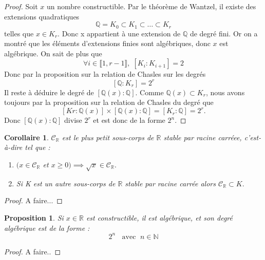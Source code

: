 \documentclass[a4paper,12pt,french]{report}
\newtheorem{proposition}{Proposition}[section]
\newtheorem{corollaire}{Corollaire}[section]
\begin{document}
		     \begin{proof}
		     Soit $x$ un nombre constructible. Par le théorème de Wantzel, il 
		     existe des extensions quadratiques \[ \mathbb{Q} = K_{0} 
		     \subset K_{1} \subset \dots \subset K_{r} \] telles que
		     \(x \in K_{r} \). Donc x appartient à une extension de \( 
		     \mathbb{Q} \) de degré fini. Or on a montré que les éléments d'extensions finies sont algébriques, donc $x$ est algébrique. On sait de plus que 
		     \[ 
		     \forall i \in \llbracket 1, r-1 \rrbracket, \;[K_{i}:K_{i+1}] = 2 
		     \]
		     Donc par la proposition sur 
		     la relation de Chasles sur les degrés \[
		     [\mathbb{Q}:K_{r}] 
		     = 2^{r} \]
		     Il reste à déduire le degré de \( 
		     [\mathbb{Q}(x):\mathbb{Q}] \). Comme \( \mathbb{Q}(x) \subset K_{r} 
		     \), nous avons toujours par la proposition sur la relation 
		     de Chasles du degré que \[ [K{r}:\mathbb{Q}(x)]\times 
		     [\mathbb{Q}(x):\mathbb{Q}] = [K_{r}:\mathbb{Q}] = 2^{r}. 
		     \]
		     Donc \([\mathbb{Q}(x):\mathbb{Q}] \) divise \(2^{r}\) et est donc 
		     de la forme \(2^{n}\).
		     \end{proof} 
		     
		\begin{corollaire}
			 \(\mathscr{C}_{\mathbb{R}} \) est le plus petit sous-corps 
			 de \(\mathbb{R}\) stable par racine carréee, c'est-à-dire 
			 tel que :
			 \begin{enumerate}
			  \item \( (x \in \mathscr{C}_{\mathbb{R}}\) et \(x \geq 0) 
			  \implies \sqrt{x} \in \mathscr{C}_{\mathbb{R}}.\)
			  \item Si K est un autre sous-corps de \(\mathbb{R}\) 
			  stable par racine carrée alors \(\mathscr{C}_{\mathbb{R}} 
			  \subset K.\)
			 \end{enumerate}
		\end{corollaire}
		\begin{proof}
			A faire...
		\end{proof}
		
			\begin{proposition}
			Si $x\in\mathbb{R}$ est constructible, il est algébrique, et son degré algébrique est de la forme : 
			\[{}
				2^{n}\;\;\mbox{ avec }\;n\in\mathbb{N}
			\]
			\end{proposition}
             \begin{proof}
	             A faire..
			 \end{proof}
	
\end{document}
